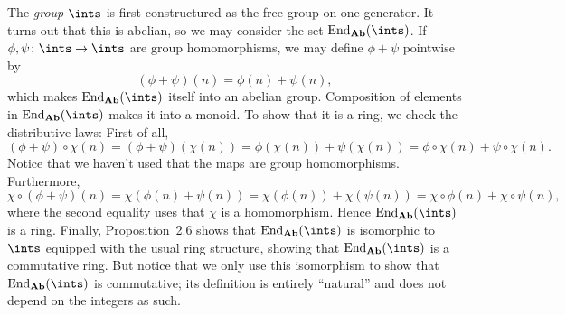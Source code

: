 \documentclass[article, a4paper, 11pt, oneside]{memoir}
\numberwithin{equation}{chapter}
\newcommand{\ncat}[1]{\mathbf{#1}} %
\newcommand{\catAb}{\ncat{Ab}} %
\newcommand{\End}{\mathrm{End}}
\theoremstyle{nonumberplain}
\begin{document}
\begin{remarkbreak}
    The \emph{group} $\ints$ is first constructured as the free group on one generator. It turns out that this is abelian, so we may consider the set $\End_\catAb(\ints)$. If $\phi,\psi \colon \ints \to \ints$ are group homomorphisms, we may define $\phi + \psi$ pointwise by
    \begin{equation*}
        (\phi + \psi)(n) = \phi(n) + \psi(n),
    \end{equation*}
    which makes $\End_\catAb(\ints)$ itself into an abelian group. Composition of elements in $\End_\catAb(\ints)$ makes it into a monoid. To show that it is a ring, we check the distributive laws: First of all,
    \begin{equation*}
        (\phi + \psi) \circ \chi(n)
            = (\phi + \psi)(\chi(n))
            = \phi(\chi(n)) + \psi(\chi(n))
            = \phi \circ \chi(n) + \psi \circ \chi(n).
    \end{equation*}
    Notice that we haven't used that the maps are group homomorphisms. Furthermore,
    \begin{equation*}
        \chi \circ (\phi + \psi)(n)
            = \chi( \phi(n) + \psi(n) )
            = \chi(\phi(n)) + \chi(\psi(n))
            = \chi \circ \phi(n) + \chi \circ \psi(n),
    \end{equation*}
    where the second equality uses that $\chi$ is a homomorphism. Hence $\End_\catAb(\ints)$ is a ring. Finally, Proposition~2.6 shows that $\End_\catAb(\ints)$ is isomorphic to $\ints$ equipped with the usual ring structure, showing that $\End_\catAb(\ints)$ is a commutative ring. But notice that we only use this isomorphism to show that $\End_\catAb(\ints)$ is commutative; its definition is entirely \enquote{natural} and does not depend on the integers as such.


\end{remarkbreak}
\end{document}
